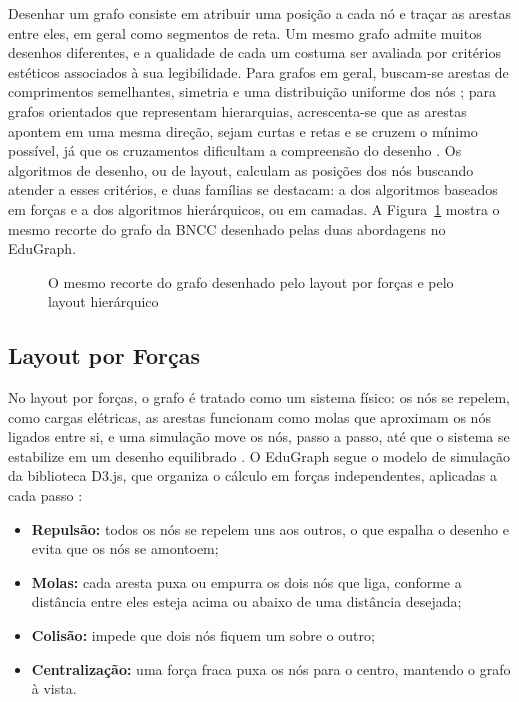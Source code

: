 Desenhar um grafo consiste em atribuir uma posição a cada nó e traçar as arestas entre eles, em geral como segmentos de reta. Um mesmo grafo admite muitos desenhos diferentes, e a qualidade de cada um costuma ser avaliada por critérios estéticos associados à sua legibilidade. Para grafos em geral, buscam-se arestas de comprimentos semelhantes, simetria e uma distribuição uniforme dos nós \cite{kobourov2013forca}; para grafos orientados que representam hierarquias, acrescenta-se que as arestas apontem em uma mesma direção, sejam curtas e retas e se cruzem o mínimo possível, já que os cruzamentos dificultam a compreensão do desenho \cite{healy2013hierarquico}. Os algoritmos de desenho, ou de layout, calculam as posições dos nós buscando atender a esses critérios, e duas famílias se destacam: a dos algoritmos baseados em forças e a dos algoritmos hierárquicos, ou em camadas. A Figura~\ref{fig-vis-layouts} mostra o mesmo recorte do grafo da BNCC desenhado pelas duas abordagens no EduGraph.

\begin{figure}[H]
    \centering
    \caption{O mesmo recorte do grafo desenhado pelo layout por forças e pelo layout hierárquico}
    \label{fig-vis-layouts}
\end{figure}


\subsection{Layout por Forças}
\label{sec-referencial-visualizacao-forcas}

No layout por forças, o grafo é tratado como um sistema físico: os nós se repelem, como cargas elétricas, as arestas funcionam como molas que aproximam os nós ligados entre si, e uma simulação move os nós, passo a passo, até que o sistema se estabilize em um desenho equilibrado \cite{kobourov2013forca}. O EduGraph segue o modelo de simulação da biblioteca D3.js, que organiza o cálculo em forças independentes, aplicadas a cada passo \cite{bostock2026d3force}:

\begin{itemize}
    \item \textbf{Repulsão:} todos os nós se repelem uns aos outros, o que espalha o desenho e evita que os nós se amontoem;
    \item \textbf{Molas:} cada aresta puxa ou empurra os dois nós que liga, conforme a distância entre eles esteja acima ou abaixo de uma distância desejada;
    \item \textbf{Colisão:} impede que dois nós fiquem um sobre o outro;
    \item \textbf{Centralização:} uma força fraca puxa os nós para o centro, mantendo o grafo à vista.
\end{itemize}

